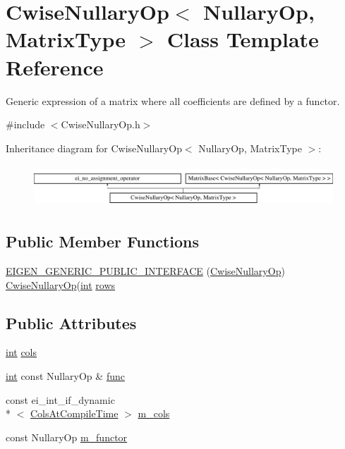 \hypertarget{class_cwise_nullary_op}{\section{Cwise\-Nullary\-Op$<$ Nullary\-Op, Matrix\-Type $>$ Class Template Reference}
\label{class_cwise_nullary_op}
}


Generic expression of a matrix where all coefficients are defined by a functor.  




{\ttfamily \#include $<$Cwise\-Nullary\-Op.\-h$>$}

Inheritance diagram for Cwise\-Nullary\-Op$<$ Nullary\-Op, Matrix\-Type $>$\-:\begin{figure}[H]
\begin{center}
\leavevmode
\includegraphics[height=1.586402cm]{class_cwise_nullary_op}
\end{center}
\end{figure}
\subsection*{Public Member Functions}
\begin{DoxyCompactItemize}
\item 
\hyperlink{class_cwise_nullary_op_af5dd683f3065aad953b83ec4e62a7618}{E\-I\-G\-E\-N\-\_\-\-G\-E\-N\-E\-R\-I\-C\-\_\-\-P\-U\-B\-L\-I\-C\-\_\-\-I\-N\-T\-E\-R\-F\-A\-C\-E} (\hyperlink{class_cwise_nullary_op}{Cwise\-Nullary\-Op}) \hyperlink{class_cwise_nullary_op}{Cwise\-Nullary\-Op}(\hyperlink{ioapi_8h_a787fa3cf048117ba7123753c1e74fcd6}{int} \hyperlink{class_matrix_base_ae82810ba95da637cdf434b4274083723}{rows}
\end{DoxyCompactItemize}
\subsection*{Public Attributes}
\begin{DoxyCompactItemize}
\item 
\hyperlink{ioapi_8h_a787fa3cf048117ba7123753c1e74fcd6}{int} \hyperlink{class_cwise_nullary_op_a6d3f028969f23734d328858dd1324f3a}{cols}
\item 
\hyperlink{ioapi_8h_a787fa3cf048117ba7123753c1e74fcd6}{int} const Nullary\-Op \& \hyperlink{class_cwise_nullary_op_af99933dc8ffb9fbac51842675e789f2a}{func}
\item 
const ei\-\_\-int\-\_\-if\-\_\-dynamic\\*
$<$ \hyperlink{class_matrix_base_aaa53a8ec1bc1ba52b1e50631dac15d6da359babfd1277ae780433d99b383e00e8}{Cols\-At\-Compile\-Time} $>$ \hyperlink{class_cwise_nullary_op_a92d550c66800b83ee79adb67eb598726}{m\-\_\-cols}
\item 
const Nullary\-Op \hyperlink{class_cwise_nullary_op_a059f642569a46d7b0a6dd2f98c4e4e3d}{m\-\_\-functor}
\end{DoxyCompactItemize}
